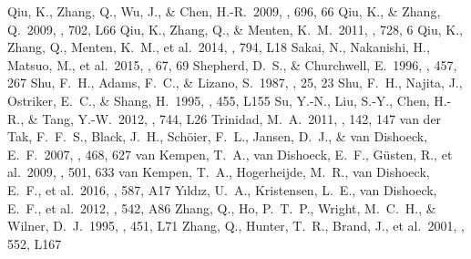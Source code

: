 \documentclass[twocolumn]{aastex61}
\begin{document}
\begin{thebibliography}{}
 Qiu, K., Zhang, Q., Wu, J., \& Chen, H.-R.\ 2009, \apj, 696, 66
 Qiu, K., \& Zhang, Q.\ 2009, \apjl, 702, L66
 Qiu, K., Zhang, Q., \& Menten, K.~M.\ 2011, \apj, 728, 6
 Qiu, K., Zhang, Q., Menten, K.~M., et al.\ 2014, \apjl, 794, L18 
 Sakai, N., Nakanishi, H., Matsuo, M., et al.\ 2015, \pasj, 67, 69
 Shepherd, D.~S., \& Churchwell, E.\ 1996, \apj, 457, 267 
 Shu, F.~H., Adams, F.~C., \& Lizano, S.\ 1987, \araa, 25, 23 
 Shu, F.~H., Najita, J., Ostriker, E.~C., \& Shang, H.\ 1995, \apjl, 455, L155 
 Su, Y.-N., Liu, S.-Y., Chen, H.-R., \& Tang, Y.-W.\ 2012, \apjl, 744, L26 
 Trinidad, M.~A.\ 2011, \aj, 142, 147 
 van der Tak, F.~F.~S., Black, J.~H., Sch{\"o}ier, F.~L., Jansen, D.~J., \& van Dishoeck, E.~F.\ 2007, \aap, 468, 627
 van Kempen, T.~A., van Dishoeck, E.~F., G{\"u}sten, R., et al.\ 2009, \aap, 501, 633 
 van Kempen, T.~A., Hogerheijde, M.~R., van Dishoeck, E.~F., et al.\ 2016, \aap, 587, A17
 Y{\i}ld{\i}z, U.~A., Kristensen, L.~E., van Dishoeck, E.~F., et al.\ 2012, \aap, 542, A86
 Zhang, Q., Ho, P.~T.~P., Wright, M.~C.~H., \& Wilner, D.~J.\ 1995, \apjl, 451, L71 
 Zhang, Q., Hunter, T.~R., Brand, J., et al.\ 2001, \apjl, 552, L167 

\end{thebibliography}
\end{document}
